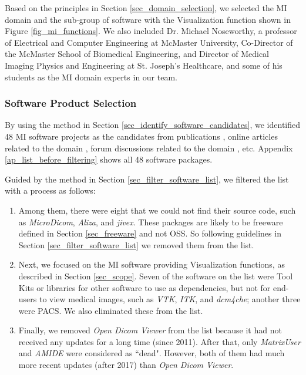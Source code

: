 \documentclass[preprint,12pt,authoryear]{elsarticle}
\begin{document}
Based on the principles in Section \ref{sec_domain_selection}, we selected the
MI domain and the sub-group of software with the Visualization function shown in
Figure \ref{fig_mi_functions}. We also included Dr. Michael Noseworthy, a
professor of Electrical and Computer Engineering at McMaster University,
Co-Director of the McMaster School of Biomedical Engineering, and Director of
Medical Imaging Physics and Engineering at St. Joseph’s Healthcare, and some of
his students as the MI domain experts in our team.

\subsubsection{Software Product Selection} \label{sec_mi_software_selection}

By using the method in Section \ref{sec_identify_software_candidates}, we
identified 48 MI software projects as the candidates from publications
\citep{Bjorn2017} \citep{Bruhschwein2019} \citep{Haak2015}, online articles related
to the domain \citep{Emms2019} \citep{Hasan2020} \citep{Mu2019}, forum discussions
related to the domain \citep{Samala2014}, etc. Appendix
\ref{ap_list_before_filtering} shows all 48 software packages.

Guided by the method in Section \ref{sec_filter_software_list}, we filtered the
list with a process as follows:

\begin{enumerate}

\item Among them, there were eight that we could not find their source code,
such as \textit{MicroDicom}, \textit{Aliza}, and \textit{jivex}. These packages
are likely to be freeware defined in Section \ref{sec_freeware} and not OSS. So
following guidelines in Section \ref{sec_filter_software_list} we removed them
from the list.

\item Next, we focused on the MI software providing Visualization functions, as
described in Section \ref{sec_scope}. Seven of the software on the list were
Tool Kits or libraries for other software to use as dependencies, but not for
end-users to view medical images, such as \textit{VTK}, \textit{ITK}, and
\textit{dcm4che}; another three were PACS. We also eliminated these from the
list.

\item Finally, we removed \textit{Open Dicom Viewer} from the list because it
had not received any updates for a long time (since 2011). After that, only
\textit{MatrixUser} and \textit{AMIDE} were considered as ``dead". However, both
of them had much more recent updates (after 2017) than \textit{Open Dicom
Viewer}.

\end{enumerate}
\end{document}
